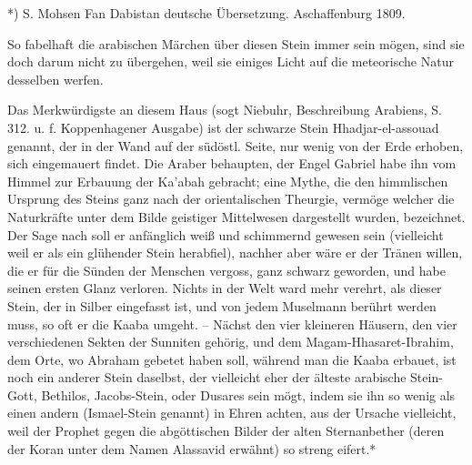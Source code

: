 \documentclass[a4paper, 11pt, oneside, polutonikogreek, german]{article}
\begin{document}
*) S. Mohsen Fan Dabistan deutsche Übersetzung. Aschaffenburg 1809.

So fabelhaft die arabischen Märchen über diesen Stein immer sein mögen, sind sie doch darum nicht zu übergehen, weil sie einiges Licht auf die meteorische Natur desselben werfen.

Das Merkwürdigste an diesem Haus (sogt Niebuhr, Beschreibung Arabiens, S. 312. u. f. Koppenhagener Ausgabe) ist der schwarze Stein Hhadjar-el-assouad genannt, der in der Wand auf der südöstl. Seite, nur wenig von der Erde erhoben, sich eingemauert findet. Die Araber behaupten, der Engel Gabriel habe ihn vom Himmel zur Erbauung der Ka'abah gebracht; eine Mythe, die den himmlischen Ursprung des Steins ganz nach der orientalischen Theurgie, vermöge welcher die Naturkräfte unter dem Bilde geistiger Mittelwesen dargestellt wurden, bezeichnet. Der Sage nach soll er anfänglich weiß und schimmernd gewesen sein (vielleicht weil er als ein glühender Stein herabfiel), nachher aber wäre er der Tränen willen, die er für die Sünden der Menschen vergoss, ganz schwarz geworden, und habe seinen ersten Glanz verloren. Nichts in der Welt ward mehr verehrt, als dieser Stein, der in Silber eingefasst ist, und von jedem Muselmann berührt werden muss, so oft er die Kaaba umgeht. -- Nächst den vier kleineren Häusern, den vier verschiedenen Sekten der Sunniten gehörig, und dem Magam-Hhasaret-Ibrahim, dem Orte, wo Abraham gebetet haben soll, während man die Kaaba erbauet, ist noch ein anderer Stein daselbst, der vielleicht eher der älteste arabische Stein-Gott, Bethilos, Jacobs-Stein, oder Dusares sein mögt, indem sie ihn so wenig als einen andern (Ismael-Stein genannt) in Ehren achten, aus der Ursache vielleicht, weil der Prophet gegen die abgöttischen Bilder der alten Sternanbether (deren der Koran unter dem Namen Alassavid erwähnt) so streng eifert.*
\end{document}

